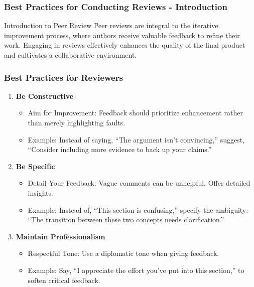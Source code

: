 \documentclass{beamer}
\begin{document}
\begin{frame}[fragile]
    \frametitle{Best Practices for Conducting Reviews - Introduction}
    \begin{block}{Introduction to Peer Review}
        Peer reviews are integral to the iterative improvement process, where authors receive valuable feedback to refine their work. Engaging in reviews effectively enhances the quality of the final product and cultivates a collaborative environment.
    \end{block}
\end{frame}

\begin{frame}[fragile]
    \frametitle{Best Practices for Reviewers}
    \begin{enumerate}
        \item \textbf{Be Constructive}
            \begin{itemize}
                \item Aim for Improvement: Feedback should prioritize enhancement rather than merely highlighting faults.
                \item Example: Instead of saying, ``The argument isn't convincing,'' suggest, ``Consider including more evidence to back up your claims.''
            \end{itemize}
        
        \item \textbf{Be Specific}
            \begin{itemize}
                \item Detail Your Feedback: Vague comments can be unhelpful. Offer detailed insights.
                \item Example: Instead of, ``This section is confusing,'' specify the ambiguity: ``The transition between these two concepts needs clarification.''
            \end{itemize}
        
        \item \textbf{Maintain Professionalism}
            \begin{itemize}
                \item Respectful Tone: Use a diplomatic tone when giving feedback.
                \item Example: Say, ``I appreciate the effort you've put into this section,'' to soften critical feedback.
            \end{itemize}
    \end{enumerate}
\end{frame}
\end{document}
